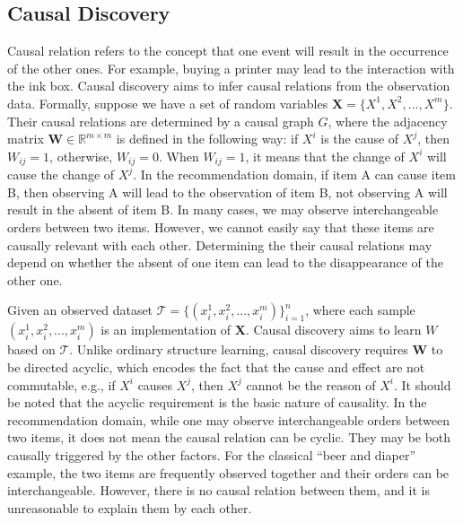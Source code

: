 \documentclass[conference]{IEEEtran}
\theoremstyle{definition}
\theoremstyle{theorem}
\theoremstyle{proof}
\theoremstyle{remark}
\begin{document}
\subsection{Causal Discovery}
Causal relation refers to the concept that one event will result in the occurrence of the other ones.
For example, buying a printer may lead to the interaction with the ink box.
Causal discovery aims to infer causal relations from the observation data.
Formally, suppose we have a set of random variables $\bm{X} = \{X^1,X^2,...,X^m\}$.
Their causal relations are determined by a causal graph $G$, where the adjacency matrix $\bm{W}\in\mathbb{R}^{m\times m}$ is defined in the following way:
if $X^i$ is the cause of $X^j$, then $W_{ij} = 1$, otherwise, $W_{ij} = 0$.
{When $W_{ij} = 1$, it means that the change of $X^i$ will cause the change of $X^j$.}
{In the recommendation domain, if item A can cause item B, then observing A will lead to the observation of item B, not observing A will result in the absent of item B.
In many cases, we may observe interchangeable orders between two items. 
However, we cannot easily say that these items are causally relevant with each other.
Determining the their causal relations may depend on whether the absent of one item can lead to the disappearance of the other one.
}


Given an observed dataset $\mathcal{T}=\{(x_i^1,x_i^2,...,x_i^m)\}_{i=1}^n$, where each sample $(x_i^1,x_i^2,...,x_i^m)$ is an implementation of $\bm{X}$.
Causal discovery aims to learn $W$ based on $\mathcal{T}$.
Unlike ordinary structure learning, causal discovery requires $\bm{W}$ to be directed acyclic, which encodes the fact that the cause and effect are not commutable, e.g., if $X^i$ causes $X^j$, then $X^j$ cannot be the reason of $X^i$.
{
It should be noted that the acyclic requirement is the basic nature of causality.
In the recommendation domain, while one may observe interchangeable orders between two items, it does not mean the causal relation can be cyclic.
They may be both causally triggered by the other factors.
For the classical ``beer and diaper'' example, the two items are frequently observed together and their orders can be interchangeable. However, there is no causal relation between them, and it is unreasonable to explain them by each other.
}
\end{document}
